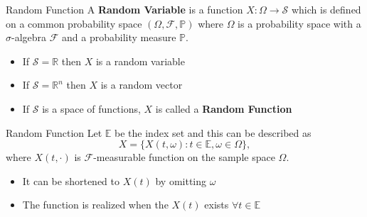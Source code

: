 \documentclass{beamer}
\begin{document}
	\begin{frame}{Random Function}
		A \textbf{Random Variable} is a function $X : \Omega \rightarrow \mathcal{S}$ which is defined on a common probability space $(\Omega, \mathcal{F}, \mathbb{P})$ where $\Omega$ is a probability space with a $\sigma$-algebra $\mathcal{F}$ and a probability measure $\mathbb{{P}}.$
		\vspace{0.2cm}
		
		\begin{itemize}
			\item If $\mathcal{S} = \mathbb{R}$ then $X$ is a random variable
			\item If $\mathcal{S} = \mathbb{R}^{n}$ then $X$ is a random vector
			\item If $\mathcal{S}$ is a space of functions, $X$ is called a \textbf{Random Function}
		\end{itemize}
	\end{frame}

	\begin{frame}{Random Function}
		Let $\mathbb{E}$ be the index set and this can be described as
		$${X = \{X(t,\omega) : t \in \mathbb{E}, \omega \in \Omega\},}$$
		where $X(t, \cdot)$ is $\mathcal{F}$-measurable function on the sample space $\Omega$.\\
		\begin{itemize}
			\item It can be shortened to $X(t)$ by omitting $\omega$
			\item The function is realized when the $X(t)$ exists $\forall t \in \mathbb{E}$
		\end{itemize}
	\end{frame}
\end{document}
